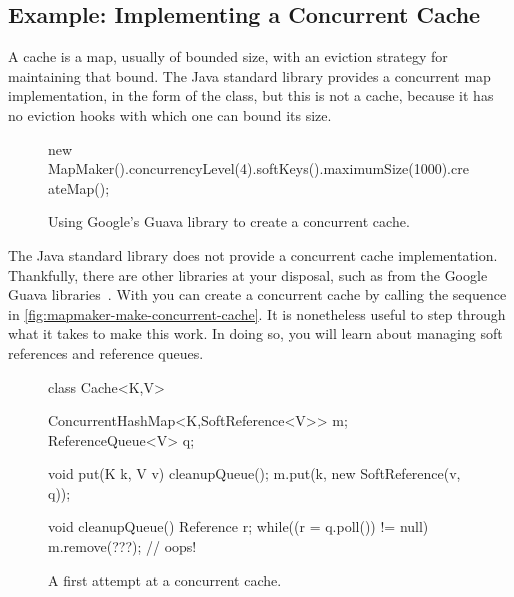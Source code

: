 \subsection{Example: Implementing a Concurrent Cache}
\label{sec:lifetime-management-concurrency-issues}

A cache is a map, usually of bounded size, with an eviction strategy for
maintaining that bound. The Java standard library provides a
concurrent map implementation, in the form of the 
class, but this is not a cache, because it has no eviction hooks with which one
can bound its size.

\begin{wrapfigure}[9]{l}{0.34\textwidth}
\centering
\vspace{-2mm}
\begin{framedlisting}
new MapMaker().concurrencyLevel(4).softKeys().maximumSize(1000).createMap();
\end{framedlisting}
\caption{Using Google's Guava library to create a concurrent cache.}
\label{fig:mapmaker-make-concurrent-cache}
\end{wrapfigure}
The Java standard library does not provide a concurrent cache implementation.
Thankfully, there are other libraries at your disposal, such as 
from the Google Guava libraries~\cite{google-guava}. With  you can create
a concurrent cache by calling the sequence in
\autoref{fig:mapmaker-make-concurrent-cache}. It is nonetheless useful to step
through what it takes to make this work. In doing so, you will learn about
managing soft references and reference queues.

\begin{wrapfigure}{r}{0.61\textwidth}
\centering
\begin{figurelisting}
class Cache<K,V> {
  ConcurrentHashMap<K,SoftReference<V>> m;
  ReferenceQueue<V> q;
   
  void put(K k, V v) {
    cleanupQueue();
    m.put(k, new SoftReference(v, q));
  }
  
  void cleanupQueue() {
    Reference r;
    while((r = q.poll()) != null)
       m.remove(???); // oops!
  }
}
\end{figurelisting}
\caption{A first attempt at a concurrent cache.}
\label{fig:concurrent-cache-first-attempt}
\end{wrapfigure}

